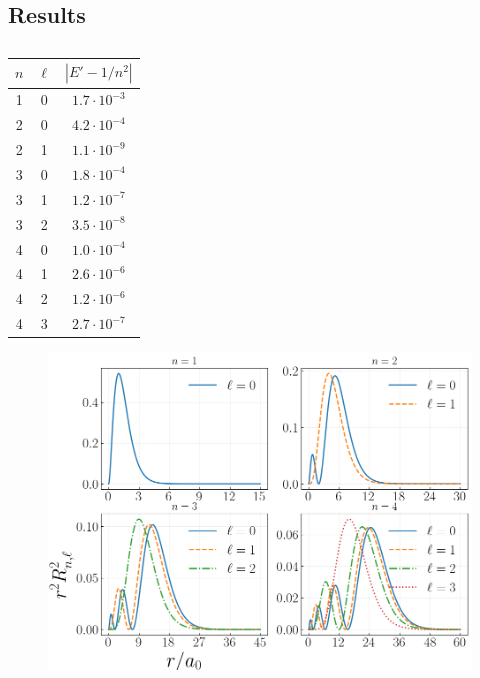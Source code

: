 \documentclass[twocolumn]{article}
\begin{document}
\begin{large}
\subsection*{Results}
\begin{table}[!b]
\centering
\begin{tabular}{c c c}
    $n$ & $\ell$ & $|E'-1/n^2|$ \\ 
    \hline\hline
    1 & 0 & $1.7\cdot 10^{-3}$ \\ 
    2 & 0 & $4.2\cdot 10^{-4}$ \\ 
    2 & 1 & $1.1\cdot 10^{-9}$ \\ 
    3 & 0 & $1.8\cdot 10^{-4}$ \\ 
    3 & 1 & $1.2\cdot 10^{-7}$ \\  
    3 & 2 & $3.5\cdot 10^{-8}$ \\ 
    4 & 0 & $1.0\cdot 10^{-4}$ \\ 
    4 & 1 & $2.6\cdot 10^{-6}$ \\ 
    4 & 2 & $1.2\cdot 10^{-6}$ \\ 
    4 & 3 & $2.7\cdot 10^{-7}$
\end{tabular}
\caption{}
\end{table}
\begin{figure}[!t]
    \includegraphics[scale=0.4]{Hatom.png}
    \caption{}
\end{figure}


















\end{large}
\end{document}
